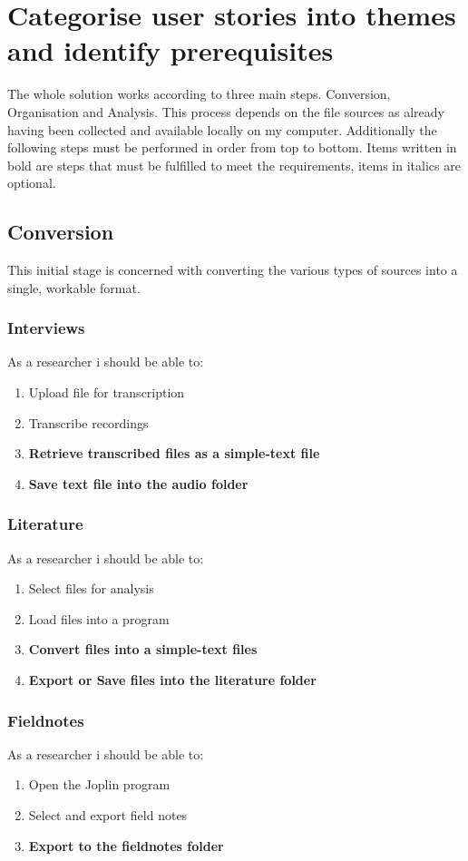 \documentclass{article}
\begin{document}
\section{Categorise user stories into themes and identify prerequisites}
The whole solution works according to three main steps. Conversion, Organisation and Analysis. This process depends on the file sources as already having been collected and available locally on my computer. Additionally the following steps must be performed in order from top to bottom. Items written in bold are steps that must be fulfilled to meet the requirements, items in italics are optional.
\subsection{Conversion}
This initial stage is concerned with converting the various types of sources into a single, workable format.

\subsubsection{Interviews}

As a researcher i should be able to:
\begin{enumerate}
    \item Upload file for transcription
    \item Transcribe recordings
    \item\textbf{Retrieve transcribed files as a simple-text file}
    \item\textbf{Save text file into the audio folder}
\end{enumerate}
\subsubsection{Literature}
As a researcher i should be able to:
\begin{enumerate}
    \item Select files for analysis
    \item Load files into a program
    \item\textbf{Convert files into a simple-text files}
    \item\textbf{Export or Save files into the literature folder}
\end{enumerate}

\subsubsection{Fieldnotes}
As a researcher i should be able to:
\begin{enumerate}
    \item Open the Joplin program
    \item Select and export field notes
    \item\textbf{Export to the fieldnotes folder}
\end{enumerate}
\end{document}
